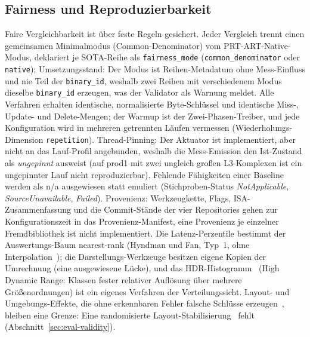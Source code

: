 \begin{nurkurz}
\subsection{Fairness und Reproduzierbarkeit}\label{sec:fairness}
Faire Vergleichbarkeit ist über feste Regeln gesichert. Jeder Vergleich trennt einen gemeinsamen
Minimalmodus (Common-Denominator) vom PRT-ART-Native-Modus, deklariert je SOTA-Reihe als
\texttt{fairness\_mode} (\texttt{common\_denominator} oder \texttt{native}); Umsetzungsstand: Der Modus ist
Reihen-Metadatum ohne Mess-Einfluss und nie Teil der \texttt{binary\_id}, weshalb zwei Reihen mit
verschiedenem Modus dieselbe \texttt{binary\_id} erzeugen, was der Validator als Warnung meldet. Alle
Verfahren erhalten identische, normalisierte Byte-Schlüssel und identische Miss-, Update- und
Delete-Mengen; der Warmup ist der Zwei-Phasen-Treiber, und jede Konfiguration wird in mehreren getrennten
Läufen vermessen (Wiederholungs-Dimension \texttt{repetition}). Thread-Pinning: Der Aktuator ist
implementiert, aber nicht an das Lauf-Profil angebunden, weshalb die Mess-Emission den Ist-Zustand als
\emph{ungepinnt} ausweist (auf prod1 mit zwei ungleich großen L3-Komplexen ist ein ungepinnter Lauf nicht
reproduzierbar). Fehlende Fähigkeiten einer
Baseline werden als n/a ausgewiesen statt emuliert (Stichproben-Status \emph{NotApplicable},
\emph{SourceUnavailable}, \emph{Failed}). Provenienz: Werkzeugkette, Flags, ISA-Zusammenfassung und die
Commit-Stände der vier Repositories gehen zur Konfigurationszeit in das Provenienz-Manifest, eine Provenienz
je einzelner Fremdbibliothek ist nicht implementiert. Die Latenz-Perzentile bestimmt der Auswertungs-Baum
nearest-rank (Hyndman und Fan, Typ~1, ohne Interpolation~\cite{hyndman1996quantiles}); die
Darstellungs-Werkzeuge besitzen eigene Kopien der Umrechnung (eine ausgewiesene Lücke), und das
HDR-Histogramm~\cite{tene_hdrhistogram} (High Dynamic Range: Klassen fester relativer Auflösung über
mehrere Größenordnungen) ist ein eigenes Verfahren der Verteilungssicht. Layout- und Umgebungs-Effekte,
die ohne erkennbaren Fehler falsche Schlüsse erzeugen~\cite{mytkowicz2009wrongdata}, bleiben eine Grenze:
Eine randomisierte Layout-Stabilisierung~\cite{curtsinger2013stabilizer} fehlt
(Abschnitt~\ref{sec:eval-validity}).
\end{nurkurz}


